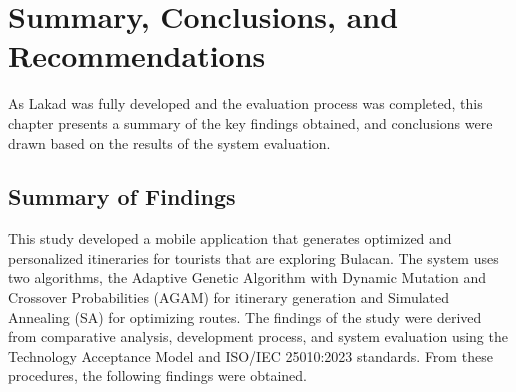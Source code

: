 \chapter{Summary, Conclusions, and Recommendations}
\thispagestyle{empty}

As Lakad was fully developed and the evaluation process was completed, this chapter presents a summary of the key findings obtained, and conclusions were drawn based on the results of the system evaluation.

\section{Summary of Findings}
This study developed a mobile application that generates optimized and personalized itineraries for tourists that are exploring Bulacan. The system uses two algorithms, the Adaptive Genetic Algorithm with Dynamic Mutation and Crossover Probabilities (AGAM) for itinerary generation and Simulated Annealing (SA) for optimizing routes. The findings of the study were derived from comparative analysis, development process, and system evaluation using the Technology Acceptance Model and ISO/IEC 25010:2023 standards. From these procedures, the following findings were obtained.

